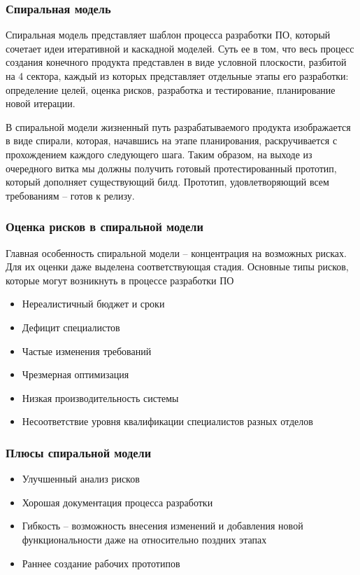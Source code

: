 \documentclass{../industrial-development}
\begin{document}
\begin{frame} \frametitle{Спиральная модель}
\begin{flushleft}
	Спиральная модель представляет шаблон процесса разработки ПО, который сочетает идеи итеративной и каскадной моделей. Суть ее в том, что весь процесс создания конечного продукта представлен в виде условной плоскости, разбитой на 4 сектора, каждый из которых представляет отдельные этапы его разработки: определение целей, оценка рисков, разработка и тестирование, планирование новой итерации.
	
	В спиральной модели жизненный путь разрабатываемого продукта изображается в виде спирали, которая, начавшись на этапе планирования, раскручивается с прохождением каждого следующего шага. Таким образом, на выходе из очередного витка мы должны получить готовый протестированный прототип, который дополняет существующий билд. Прототип, удовлетворяющий всем требованиям – готов к релизу.
\end{flushleft}
\end{frame}

\begin{frame} \frametitle{Оценка рисков в спиральной модели}
\begin{flushleft}
	Главная особенность спиральной модели – концентрация на возможных рисках. Для их оценки даже выделена соответствующая стадия. Основные типы рисков, которые могут возникнуть в процессе разработки ПО
\end{flushleft}
\begin{itemize}
\item Нереалистичный бюджет и сроки
\item Дефицит специалистов
\item Частые изменения требований
\item Чрезмерная оптимизация
\item Низкая производительность системы
\item Несоответствие уровня квалификации специалистов разных отделов
\end{itemize}
\end{frame}

\begin{frame} \frametitle{Плюсы спиральной модели}
\begin{itemize}
	\item Улучшенный анализ рисков
	\item Хорошая документация процесса разработки
	\item Гибкость – возможность внесения изменений и добавления новой функциональности даже на относительно поздних этапах
	\item Раннее создание рабочих прототипов
\end{itemize}
\end{frame}
\end{document}
